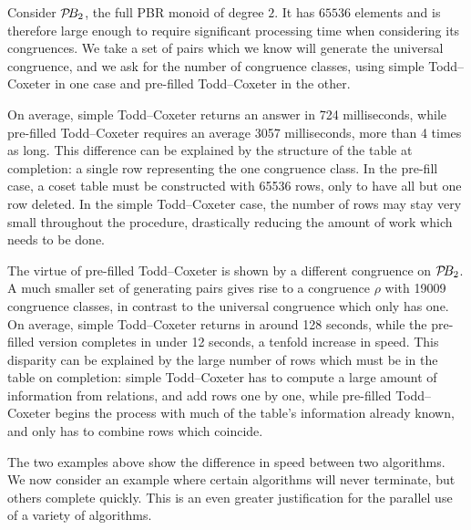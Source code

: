 \begin{example}
  \label{ex:good-tc}
  Consider $\mathcal{P}\!B_2$, the full PBR monoid of degree $2$.  It has $65536$ elements
  and is therefore large enough to require significant processing time when
  considering its congruences.   We take a set of pairs which we know will
  generate the universal congruence, and we ask \libsemigroups{} for the
  number of congruence classes, using simple Todd--Coxeter in one case and
  pre-filled Todd--Coxeter in the other.

  On average, simple Todd--Coxeter returns an answer in 724 milliseconds, while
  pre-filled Todd--Coxeter requires an average 3057 milliseconds, more than 4
  times as long.  This difference can be explained by the structure
  of the table at completion: a single row representing the one congruence
  class.  In the pre-fill case, a coset table must be constructed with 65536
  rows, only to have all but one row deleted.  In the simple Todd--Coxeter case,
  the number of rows may stay very small throughout the procedure, drastically
  reducing the amount of work which needs to be done.
\end{example}

\begin{example}
  \label{ex:good-tc-prefill}
  The virtue of pre-filled Todd--Coxeter is shown by a different congruence on
  $\mathcal{P}\!B_2$.  A much smaller set of generating pairs gives rise to a congruence
  $\rho$ with 19009 congruence classes, in contrast to the universal congruence
  which only has one.  On average, simple Todd--Coxeter returns in around 128
  seconds, while the pre-filled version completes in under 12 seconds, a tenfold
  increase in speed.  This disparity can be explained by the large number of
  rows which must be in the table on completion: simple Todd--Coxeter has to
  compute a large amount of information from relations, and add rows one by one,
  while pre-filled Todd--Coxeter begins the process with much of the table's
  information already known, and only has to combine rows which coincide.
\end{example}

The two examples above show the difference in speed between two algorithms.  We
now consider an example where certain algorithms will never terminate, but
others complete quickly.  This is an even greater justification for the parallel
use of a variety of algorithms.

